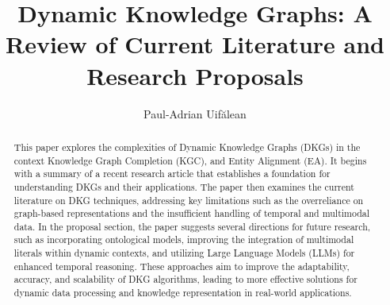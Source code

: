 \documentclass[runningheads]{llncs}
\begin{document}
    \title{Dynamic Knowledge Graphs: A Review of Current Literature and Research Proposals}

    \author{Paul-Adrian Uif\u{a}lean}

    
    \maketitle 
    
    \begin{abstract}
        This paper explores the complexities of Dynamic Knowledge Graphs (DKGs) in the context Knowledge Graph Completion (KGC), and Entity Alignment (EA). 
        It begins with a summary of a recent research article that establishes a foundation for understanding DKGs and their applications. 
        The paper then examines the current literature on DKG techniques, addressing key limitations such as the overreliance on graph-based representations and the insufficient handling of 
        temporal and multimodal data.
        In the proposal section, the paper suggests several directions for future research, such as incorporating ontological models, improving the integration of multimodal literals within 
        dynamic contexts, and utilizing Large Language Models (LLMs) for enhanced temporal reasoning. These approaches aim to improve the adaptability, accuracy, and scalability of DKG 
        algorithms, leading to more effective solutions for dynamic data processing and knowledge representation in real-world applications.
    \end{abstract}
    

    
    
    
    
    

    
    
\end{document}
